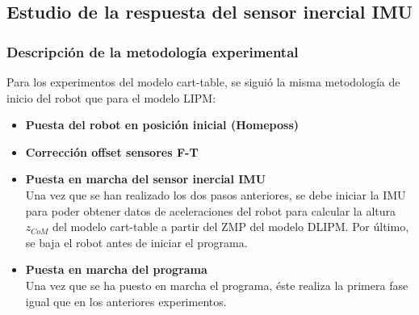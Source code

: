 \subsection{Estudio de la respuesta del sensor inercial IMU}\label{respuestaIMU}

\subsubsection{Descripción de la metodología experimental}

Para los experimentos del modelo cart-table, se siguió la misma metodología de inicio del robot que para el modelo LIPM:

\begin{itemize}
\item \textbf{Puesta del robot en posición inicial (Homeposs)}\\

\item \textbf{Corrección offset sensores F-T} 

\item \textbf{Puesta en marcha del sensor inercial IMU}\\ Una vez que se han realizado los dos pasos anteriores, se debe iniciar la IMU para poder obtener datos de aceleraciones del robot para calcular la altura $z_{CoM}$ del modelo cart-table a partir del ZMP del modelo DLIPM. Por último, se baja el robot antes de iniciar el programa.

\item \textbf{Puesta en marcha del programa}\\ Una vez que se ha puesto en marcha el programa, éste realiza la primera fase igual que en los anteriores experimentos. 
\end{itemize}




\afterpage{\null\newpage}
\newpage
